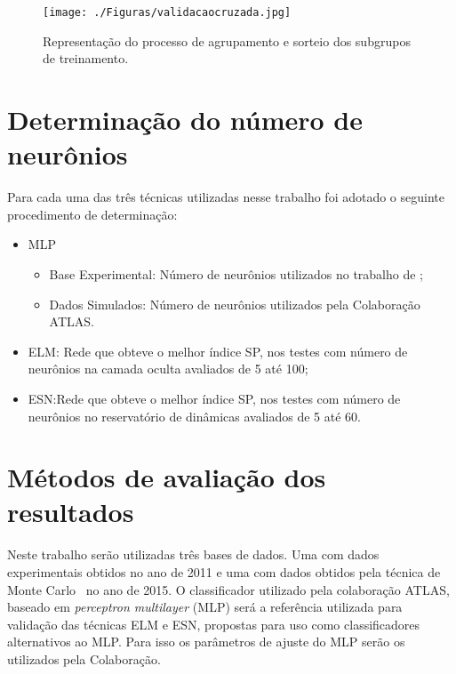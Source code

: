 \begin{figure}[H]
   \centering  
   \caption{Representação do processo de agrupamento e sorteio dos subgrupos de treinamento.}
   \texttt{[image: ./Figuras/validacaocruzada.jpg]}
   \label{fig:validacao}
\end{figure}

\section{Determinação do número de neurônios}\label{met:nNeu}

Para cada uma das três técnicas utilizadas nesse trabalho foi adotado o seguinte procedimento de determinação:

\begin{itemize}
	\item MLP
	\begin{itemize}
		\item Base Experimental: Número de neurônios utilizados no trabalho de ;
		\item Dados Simulados: Número de neurônios utilizados pela Colaboração ATLAS.
	\end{itemize}
	\item ELM: Rede que obteve o melhor índice SP, nos testes com número de neurônios na camada oculta avaliados de 5 até 100;
	\item ESN:Rede que obteve o melhor índice SP, nos testes com número de neurônios no reservatório de dinâmicas avaliados de 5 até 60.
\end{itemize}

\section{Métodos de avaliação dos resultados}

Neste trabalho serão utilizadas três bases de dados. Uma com dados experimentais obtidos no ano de 2011 e uma com dados obtidos pela técnica de Monte Carlo~\cite{yoriyaz2009} no ano de 2015. O classificador utilizado pela colaboração ATLAS, baseado em \textit{perceptron multilayer} (MLP) será a referência utilizada para validação das técnicas ELM e ESN, propostas para uso como classificadores alternativos ao MLP. Para isso os parâmetros de ajuste do MLP serão os utilizados pela Colaboração.

